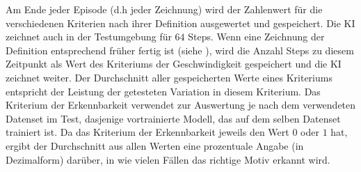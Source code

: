 Am Ende jeder Episode (d.h jeder Zeichnung) wird der Zahlenwert für die
verschiedenen Kriterien nach ihrer Definition ausgewertet und gespeichert. Die
KI zeichnet auch in der Testumgebung für $64$ Steps. Wenn eine Zeichnung der
Definition entsprechend früher fertig ist (siehe ),
wird die Anzahl Steps zu diesem Zeitpunkt als Wert des Kriteriums der
Geschwindigkeit gespeichert und die KI zeichnet weiter. Der Durchschnitt aller
gespeicherten Werte eines Kriteriums entspricht der Leistung der getesteten
Variation in diesem Kriterium. Das Kriterium der Erkennbarkeit verwendet zur
Auswertung je nach dem verwendeten Datenset im Test, dasjenige vortrainierte
Modell, das auf dem selben Datenset trainiert ist. Da das Kriterium der
Erkennbarkeit jeweils den Wert $0$ oder $1$ hat, ergibt der Durchschnitt aus
allen Werten eine prozentuale Angabe (in Dezimalform) darüber, in wie vielen
Fällen das richtige Motiv erkannt wird.



